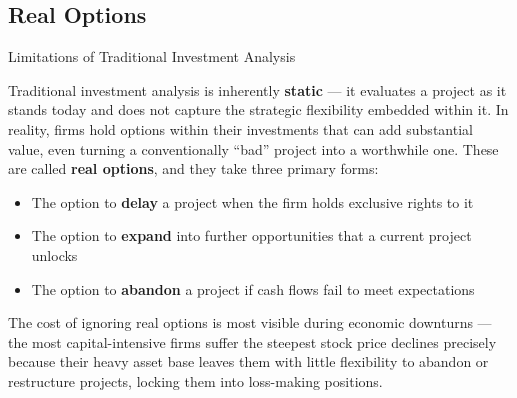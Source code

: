 \documentclass[10pt]{article}
\begin{document}
  \subsection{Real Options}

    \begin{core}{Limitations of Traditional Investment Analysis}

      Traditional investment analysis is inherently \textbf{static} — it evaluates a project as it stands today and does not capture the strategic flexibility embedded within it. In reality, firms hold options within their investments that can add substantial value, even turning a conventionally ``bad'' project into a worthwhile one. These are called \textbf{real options}, and they take three primary forms:

      \begin{itemize}

        \item The option to \textbf{delay} a project when the firm holds exclusive rights to it

        \item The option to \textbf{expand} into further opportunities that a current project unlocks

        \item The option to \textbf{abandon} a project if cash flows fail to meet expectations

      \end{itemize}

      The cost of ignoring real options is most visible during economic downturns — the most capital-intensive firms suffer the steepest stock price declines precisely because their heavy asset base leaves them with little flexibility to abandon or restructure projects, locking them into loss-making positions.


    \end{core}
\end{document}
